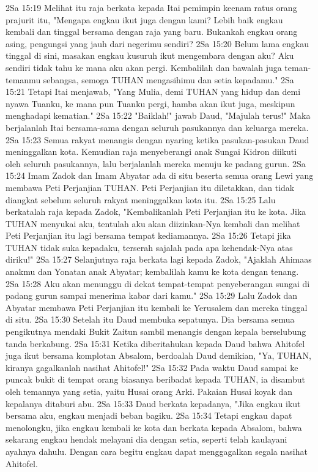 2Sa 15:19  Melihat itu raja berkata kepada Itai pemimpin keenam ratus orang prajurit itu, "Mengapa engkau ikut juga dengan kami? Lebih baik engkau kembali dan tinggal bersama dengan raja yang baru. Bukankah engkau orang asing, pengungsi yang jauh dari negerimu sendiri?
2Sa 15:20  Belum lama engkau tinggal di sini, masakan engkau kusuruh ikut mengembara dengan aku? Aku sendiri tidak tahu ke mana aku akan pergi. Kembalilah dan bawalah juga teman-temanmu sebangsa, semoga TUHAN mengasihimu dan setia kepadamu."
2Sa 15:21  Tetapi Itai menjawab, "Yang Mulia, demi TUHAN yang hidup dan demi nyawa Tuanku, ke mana pun Tuanku pergi, hamba akan ikut juga, meskipun menghadapi kematian."
2Sa 15:22  "Baiklah!" jawab Daud, "Majulah terus!" Maka berjalanlah Itai bersama-sama dengan seluruh pasukannya dan keluarga mereka.
2Sa 15:23  Semua rakyat menangis dengan nyaring ketika pasukan-pasukan Daud meninggalkan kota. Kemudian raja menyeberangi anak Sungai Kidron diikuti oleh seluruh pasukannya, lalu berjalanlah mereka menuju ke padang gurun.
2Sa 15:24  Imam Zadok dan Imam Abyatar ada di situ beserta semua orang Lewi yang membawa Peti Perjanjian TUHAN. Peti Perjanjian itu diletakkan, dan tidak diangkat sebelum seluruh rakyat meninggalkan kota itu.
2Sa 15:25  Lalu berkatalah raja kepada Zadok, "Kembalikanlah Peti Perjanjian itu ke kota. Jika TUHAN menyukai aku, tentulah aku akan diizinkan-Nya kembali dan melihat Peti Perjanjian itu lagi bersama tempat kediamannya.
2Sa 15:26  Tetapi jika TUHAN tidak suka kepadaku, terserah sajalah pada apa kehendak-Nya atas diriku!"
2Sa 15:27  Selanjutnya raja berkata lagi kepada Zadok, "Ajaklah Ahimaas anakmu dan Yonatan anak Abyatar; kembalilah kamu ke kota dengan tenang.
2Sa 15:28  Aku akan menunggu di dekat tempat-tempat penyeberangan sungai di padang gurun sampai menerima kabar dari kamu."
2Sa 15:29  Lalu Zadok dan Abyatar membawa Peti Perjanjian itu kembali ke Yerusalem dan mereka tinggal di situ.
2Sa 15:30  Setelah itu Daud membuka sepatunya. Dia bersama semua pengikutnya mendaki Bukit Zaitun sambil menangis dengan kepala berselubung tanda berkabung.
2Sa 15:31  Ketika diberitahukan kepada Daud bahwa Ahitofel juga ikut bersama komplotan Absalom, berdoalah Daud demikian, "Ya, TUHAN, kiranya gagalkanlah nasihat Ahitofel!"
2Sa 15:32  Pada waktu Daud sampai ke puncak bukit di tempat orang biasanya beribadat kepada TUHAN, ia disambut oleh temannya yang setia, yaitu Husai orang Arki. Pakaian Husai koyak dan kepalanya ditaburi abu.
2Sa 15:33  Daud berkata kepadanya, "Jika engkau ikut bersama aku, engkau menjadi beban bagiku.
2Sa 15:34  Tetapi engkau dapat menolongku, jika engkau kembali ke kota dan berkata kepada Absalom, bahwa sekarang engkau hendak melayani dia dengan setia, seperti telah kaulayani ayahnya dahulu. Dengan cara begitu engkau dapat menggagalkan segala nasihat Ahitofel.
